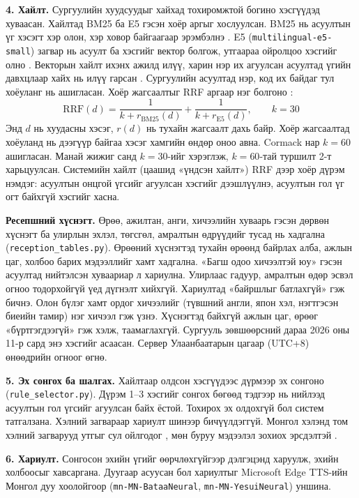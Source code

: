 \textbf{4. Хайлт.} Сургуулийн хуудсуудыг хайхад тохиромжтой богино хэсгүүдэд хуваасан. Хайлтад BM25 ба E5 гэсэн хоёр аргыг хослуулсан. BM25 нь асуултын үг хэсэгт хэр олон, хэр ховор байгаагаар эрэмбэлнэ \cite{robertson2009bm25}. E5 (\texttt{multilingual-e5-small}) загвар нь асуулт ба хэсгийг вектор болгож, утгаараа ойролцоо хэсгийг олно \cite{wang2024me5}. Векторын хайлт ихэнх ажилд илүү, харин нэр их агуулсан асуултад үгийн давхцлаар хайх нь илүү гарсан \cite{lewis2020rag}. Сургуулийн асуултад нэр, код их байдаг тул хоёуланг нь ашигласан. Хоёр жагсаалтыг \ac{RRF} аргаар нэг болгоно \cite{cormack2009rrf}:
\begin{equation}
\mathrm{RRF}(d) = \frac{1}{k + r_{\mathrm{BM25}}(d)} + \frac{1}{k + r_{\mathrm{E5}}(d)}, \qquad k = 30
\label{eq:rrf}
\end{equation}
Энд $d$ нь хуудасны хэсэг, $r(d)$ нь тухайн жагсаалт дахь байр. Хоёр жагсаалтад хоёуланд нь дээгүүр байгаа хэсэг хамгийн өндөр оноо авна. Cormack нар $k=60$ ашигласан. Манай жижиг санд $k=30$-ийг хэрэглэж, $k=60$-тай туршилт 2-т харьцуулсан. Системийн хайлт (цаашид «үндсэн хайлт») RRF дээр хоёр дүрэм нэмдэг: асуултын онцгой үгсийг агуулсан хэсгийг дээшлүүлнэ, асуултын гол үг огт байхгүй хэсгийг хасна.

\textbf{Ресепшний хүснэгт.} Өрөө, ажилтан, анги, хичээлийн хуваарь гэсэн дөрвөн хүснэгт ба улирлын эхлэл, төгсгөл, амралтын өдрүүдийг тусад нь хадгална (\texttt{reception\_tables.py}). Өрөөний хүснэгтэд тухайн өрөөнд байрлах алба, ажлын цаг, холбоо барих мэдээллийг хамт хадгална. «Багш одоо хичээлтэй юу» гэсэн асуултад нийтэлсэн хуваариар л хариулна. Улирлаас гадуур, амралтын өдөр эсвэл огноо тодорхойгүй үед дүгнэлт хийхгүй. Хариултад «байршлыг батлахгүй» гэж бичнэ. Олон бүлэг хамт ордог хичээлийг (түвшний англи, япон хэл, нэгтгэсэн биеийн тамир) нэг хичээл гэж үзнэ. Хүснэгтэд байхгүй ажлын цаг, өрөөг «бүртгэгдээгүй» гэж хэлж, таамаглахгүй. Сургууль зөвшөөрсний дараа 2026 оны 11-р сард энэ хэсгийг асаасан. Сервер Улаанбаатарын цагаар (UTC+8) өнөөдрийн огноог өгнө.

\textbf{5. Эх сонгох ба шалгах.} Хайлтаар олдсон хэсгүүдээс дүрмээр эх сонгоно (\texttt{rule\_selector.py}). Дүрэм 1--3 хэсгийг сонгох бөгөөд тэдгээр нь нийлээд асуултын гол үгсийг агуулсан байх ёстой. Тохирох эх олдохгүй бол систем татгалзана. Хэлний загвараар хариулт шинээр бичүүлдэггүй. Монгол хэлэнд том хэлний загварууд утгыг сул ойлгодог \cite{zhang2024mmeval}, мөн буруу мэдээлэл зохиох эрсдэлтэй \cite{antico2024unimib}.

\textbf{6. Хариулт.} Сонгосон эхийн үгийг өөрчлөхгүйгээр дэлгэцэнд харуулж, эхийн холбоосыг хавсаргана. Дуугаар асуусан бол хариултыг Microsoft Edge TTS-ийн Монгол дуу хоолойгоор (\texttt{mn-MN-BataaNeural}, \texttt{mn-MN-YesuiNeural}) уншина.


